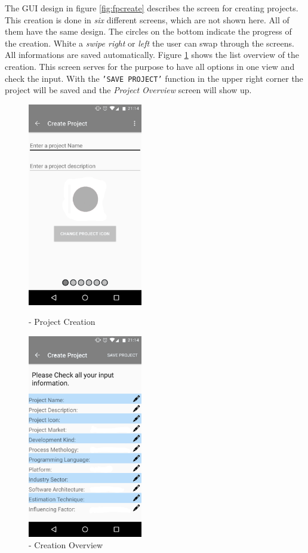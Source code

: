The GUI design in figure \ref{fig:fpcreate} describes the screen for creating projects. This creation is done in \textit{six} different screens, which are not shown here. All of them have the same design. The circles on the bottom indicate the progress of the creation. White a \textit{swipe right} or \textit{left} the user can swap through the screens. All informations are saved automatically. Figure \ref{fig:fpcreateOverview} shows the list overview of the creation. This screen serves for the purpose to have all options in one view and check the input. With the \texttt{'SAVE PROJECT'} function in the upper right corner the project will be saved and the \textit{Project Overview} screen will show up.
\begin{figure}[htb]
	\centering
	\begin{minipage}[t]{0.45\linewidth}
		\centering 
		\includegraphics[width=5cm]{images/ProjectCreation.png} 
		\caption{- Project Creation} 
		\label{fig:fpcreate}
	\end{minipage}%
	\hfill
	\begin{minipage}[t]{0.45\linewidth}
		\centering 
		\includegraphics[width=5cm]{images/CreationOverview.png} 
		\caption{- Creation Overview} 
		\label{fig:fpcreateOverview}
	\end{minipage}
\end{figure}

